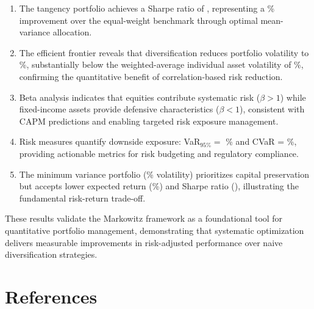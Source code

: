 \documentclass[a4paper, 11pt]{article}
\begin{document}
\begin{enumerate}
\item The tangency portfolio achieves a Sharpe ratio of ,
representing a \%
improvement over the equal-weight benchmark through optimal mean-variance allocation.

\item The efficient frontier reveals that diversification reduces portfolio volatility to
\%, substantially below the weighted-average individual asset
volatility of \%, confirming the quantitative benefit
of correlation-based risk reduction.

\item Beta analysis indicates that equities contribute systematic risk ($\beta > 1$) while
fixed-income assets provide defensive characteristics ($\beta < 1$), consistent with CAPM
predictions and enabling targeted risk exposure management.

\item Risk measures quantify downside exposure: VaR$_{95\%} = $ \%
and CVaR = \%, providing actionable metrics for risk budgeting
and regulatory compliance.

\item The minimum variance portfolio (\% volatility) prioritizes
capital preservation but accepts lower expected return (\%) and
Sharpe ratio (), illustrating the fundamental risk-return trade-off.
\end{enumerate}

These results validate the Markowitz framework as a foundational tool for quantitative
portfolio management, demonstrating that systematic optimization delivers measurable
improvements in risk-adjusted performance over naive diversification strategies.

\section*{References}
\end{document}
